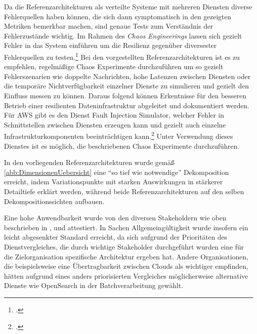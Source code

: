 Da die Referenzarchitekturen als verteilte Systeme mit mehreren Diensten diverse Fehlerquellen haben können, die sich dann symptomatisch in den gezeigten Metriken bemerkbar machen, sind genaue Tests zum Verständnis der Fehlerzustände wichtig. Im Rahmen des \textit{Chaos Engineerings} lassen sich gezielt Fehler in das System einführen um die Resilienz gegenüber diversester Fehlerquellen zu testen.\footcite[Vgl.][]{Augsten.2020} Bei den vorgestellten Referenzarchitekturen ist es zu empfehlen, regelmäßige Chaos Experimente durchzuführen um so gezielt Fehlerszenarien wie doppelte Nachrichten, hohe Latenzen zwischen Diensten oder die temporäre Nichtverfügbarkeit einzelner Dienste zu simulieren und gezielt den Einfluss messen zu können. Daraus folgend können Erkentnisse für den besseren Betrieb einer resilienten Dateninfrastruktur abgeleitet und dokumentiert werden. Für \ac{AWS} gibt es den Dienst Fault Injection Simulator, welcher Fehler in Schnittstellen zwischen Diensten erzeugen kann und gezielt auch einzelne Infrastrukturkomponenten beeinträchtigen kann.\footcite[Vgl.][]{Barr.2021b} Unter Verwendung dieses Dienstes ist es möglich, die beschriebenen Chaos Experimente durchzuführen.

In den vorliegenden Referenzarchitekturen wurde gemäß \autoref{abb:DimensionenUebersicht} eine \enquote{so tief wie notwendige} Dekomposition erreicht, indem Variationspunkte mit starken Auswirkungen in stärkerer Detailtiefe erklärt werden, während beide Referenzarchitekturen auf den selben Dekompositionssichten aufbauen.

Eine hohe Anwendbarkeit wurde von den diversen Stakeholdern wie oben beschrieben in ,  und  attestiert.
In Sachen Allgemeingültigkeit wurde insofern ein leicht abgesenkter Standard erreicht, da sich aufgrund der Prioritäten des Dienstvergleiches, die durch wichtige Stakeholder durchgeführt wurden eine für die Zielorganisation spezifische Architektur ergeben hat. Andere Organisationen, die beispielsweise eine Übertragbarkeit zwischen Clouds als wichtiger empfinden, hätten aufgrund eines anders priorisierten Vergleiches möglicherweise alternative Dienste wie OpenSearch in der Batchverarbeitung gewählt.

